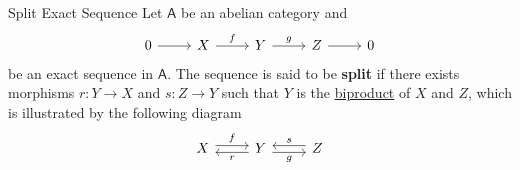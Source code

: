 \begin{definition}{Split Exact Sequence}{}
    Let $\mathsf{A}$ be an abelian category and 
    \[
    \begin{tikzcd}[ampersand replacement=\&]
        0 \arrow[r] \& X \arrow[r, "f"] \& Y \arrow[r, "g"] \& Z \arrow[r] \& 0
    \end{tikzcd}
    \]
    be an exact sequence in $\mathsf{A}$. The sequence is said to be \textbf{split} if there exists morphisms $r:Y\to X$ and $s:Z\to Y$ such that $Y$ is the \hyperref[th:biproduct]{biproduct} of $X$ and $Z$, which is illustrated by the following diagram
    \[
        \begin{tikzcd}[ampersand replacement=\&]
                X \arrow[r, "f", shift left] \& Y \arrow[l, "r", shift left] \arrow[r, "g"', shift right] \& Z \arrow[l, "s"', shift right]
        \end{tikzcd}
    \]
\end{definition}

